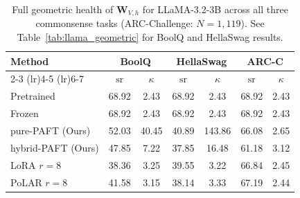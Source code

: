 \begin{table}[t]
\centering
\small
\setlength{\tabcolsep}{4pt}
\caption{Full geometric health of $\mathbf{W}_{V,h}$ for LLaMA-3.2-3B across all three commonsense tasks (ARC-Challenge: $N{=}1{,}119$). See Table~\ref{tab:llama_geometric} for BoolQ and HellaSwag results.}
\label{tab:llama_geometric_full}
\begin{tabular}{lcccccc}
\toprule
\textbf{Method} & \multicolumn{2}{c}{\textbf{BoolQ}} & \multicolumn{2}{c}{\textbf{HellaSwag}} & \multicolumn{2}{c}{\textbf{ARC-C}} \\
\cmidrule(lr){2-3} \cmidrule(lr){4-5} \cmidrule(lr){6-7}
 & $\operatorname{sr}$ & $\kappa$ & $\operatorname{sr}$ & $\kappa$ & $\operatorname{sr}$ & $\kappa$ \\
\midrule
Pretrained & 68.92 & 2.43 & 68.92 & 2.43 & 68.92 & 2.43 \\
\midrule
Frozen & 68.92 & 2.43 & 68.92 & 2.43 & 68.92 & 2.43 \\
\midrule
pure-PAFT (Ours) & 52.03 & 40.45 & 40.89 & 143.86 & 66.08 & 2.65 \\
hybrid-PAFT (Ours) & 47.85 & 7.22 & 37.85 & 16.48 & 61.18 & 3.12 \\
\midrule
LoRA $r{=}8$ & 38.36 & 3.25 & 39.55 & 3.22 & 66.84 & 2.45 \\
PoLAR $r{=}8$ & 41.58 & 3.15 & 38.14 & 3.33 & 67.19 & 2.44 \\
\bottomrule
\end{tabular}
\end{table}